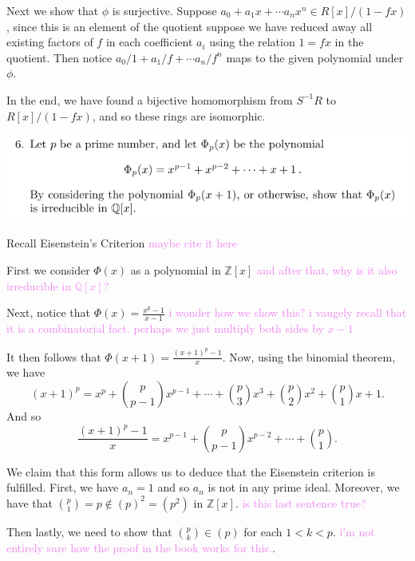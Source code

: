 \documentclass[12pt,letterpaper,boxed]{hmcpset}
\newcommand{\wg}[1]{\textcolor{violet}{#1}}
\newcommand{\Q}{\mathbb Q}
\newcommand{\Z}{\mathbb Z}
\newcommand{\inv}{^{-1}}
\begin{document}
\begin{solution}
Next we show that $\phi$ is surjective. Suppose
$a_0 + a_1x + \cdots a_nx^n \in R[x]/(1-fx)$, since this is an element
of the quotient suppose we have reduced away all existing factors of
$f$ in each coefficient $a_i$ using the relation $1 = fx$ in the
quotient.
Then notice $a_0/1 +
a_1/f + \cdots a_n/f^n$ maps to the given polynomial under $\phi$.

In the end, we have found a bijective homomorphism from $S\inv R$ to
$R[x]/(1-fx)$, and so these rings are isomorphic. 
\end{solution}

\newpage

\begin{problem}
	\includegraphics[scale=0.8]{6.png}
	\hfill
\end{problem}

\begin{solution}
Recall Eisenstein's Criterion \wg{maybe cite it here}

First we consider $\Phi(x)$ as a polynomial in $\Z[x]$
\wg{and after that, why is it also irreducible in $\Q[x]$?}

Next, notice that $\Phi(x) = \frac{x^p-1}{x-1}$ \wg{i wonder how
we show this? i vaugely recall that it is a combinatorial fact.
perhaps we just multiply both sides by $x-1$}

It then follows that $\Phi(x+1) = \frac{(x+1)^p - 1}{x}$. Now, using
the binomial theorem, we have \[
(x+1)^p = x^p + \binom{p}{p-1}x^{p-1} + \cdots + \binom{p}{3}x^3 +
\binom{p}{2}x^2 + \binom{p}{1} x + 1.
\]
And so \[
	\frac{(x+1)^p - 1}{x}
	= x^{p-1} + \binom{p}{p-1} x^{p-2} + \cdots + \binom{p}{1}.
\]

We claim that this form allows us to deduce that the Eisenstein
criterion is fulfilled.
First, we have $a_n = 1$ and so $a_n$ is not in any prime ideal.
Moreover, we have that $\binom{p}{1} = p \not\in (p)^2 = (p^2)$ in
$\Z[x]$. \wg{is this last sentence true?}

Then lastly, we need to show that $\binom{p}{k} \in (p)$ for each $1 <
k < p$. \wg{i'm not entirely sure how the proof in the book works for
this.}. 
\end{solution}
\end{document}
